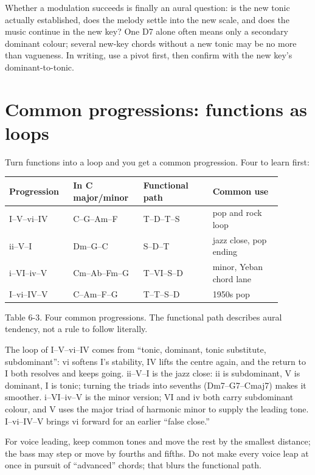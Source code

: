 Whether a modulation succeeds is finally an aural question: is the new tonic actually established, does the melody settle into the new scale, and does the music continue in the new key? One D7 alone often means only a secondary dominant colour; several new-key chords without a new tonic may be no more than vagueness. In writing, use a pivot first, then confirm with the new key's dominant-to-tonic.

\section{Common progressions: functions as loops}

Turn functions into a loop and you get a common progression. Four to learn first:

\begin{center}
\small
\begin{tabular}{p{0.20\linewidth}p{0.23\linewidth}p{0.23\linewidth}p{0.23\linewidth}}
\toprule
Progression & In C major/minor & Functional path & Common use \\
\midrule
I--V--vi--IV & C--G--Am--F & T--D--T--S & pop and rock loop \\
ii--V--I & Dm--G--C & S--D--T & jazz close, pop ending \\
i--VI--iv--V & Cm--Ab--Fm--G & T--VI--S--D & minor, Yeban chord lane \\
I--vi--IV--V & C--Am--F--G & T--T--S--D & 1950s pop \\
\bottomrule
\end{tabular}

Table 6-3. Four common progressions. The functional path describes aural tendency, not a rule to follow literally.
\end{center}

The loop of I--V--vi--IV comes from ``tonic, dominant, tonic substitute, subdominant'': vi softens I's stability, IV lifts the centre again, and the return to I both resolves and keeps going. ii--V--I is the jazz close: ii is subdominant, V is dominant, I is tonic; turning the triads into sevenths (Dm7--G7--Cmaj7) makes it smoother. i--VI--iv--V is the minor version; VI and iv both carry subdominant colour, and V uses the major triad of harmonic minor to supply the leading tone. I--vi--IV--V brings vi forward for an earlier ``false close.''

For voice leading, keep common tones and move the rest by the smallest distance; the bass may step or move by fourths and fifths. Do not make every voice leap at once in pursuit of ``advanced'' chords; that blurs the functional path.

